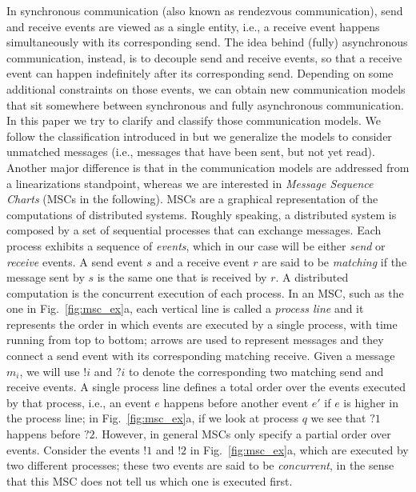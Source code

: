 


In synchronous communication (also known as rendezvous communication), send and receive events are  viewed as a single entity, i.e., a receive event  happens simultaneously with its corresponding send. The  idea behind (fully) asynchronous communication, instead, is to decouple send and receive events, so that a receive event can happen indefinitely after its corresponding send. Depending on some additional constraints on those events, we can obtain new communication models that sit somewhere between synchronous and fully asynchronous communication.
In this paper we try to clarify and classify those communication models. We follow the classification introduced in \cite{DBLP:journals/fac/ChevrouHQ16} but we generalize the models to  consider unmatched messages (i.e., messages that have been sent, but not yet read). Another major difference is that in \cite{DBLP:journals/fac/ChevrouHQ16} the communication models are addressed from a linearizations standpoint, whereas we are interested in \emph{Message Sequence Charts} (MSCs in the following). 
MSCs  are a graphical representation of the  computations of distributed systems.  Roughly speaking, a distributed system is composed by a set of sequential processes that can exchange messages. Each process exhibits a sequence of \emph{events}, which in our case will be either \emph{send} or \emph{receive} events. A send event $s$ and a receive event $r$ are said to be \emph{matching} if the message sent by $s$ is the same one that is received by $r$. A distributed computation is the concurrent execution of each process. In an MSC, such as the one in Fig.~\ref{fig:msc_ex}a, each vertical line is called a \emph{process line} and it represents the order in which events are executed by a single process, with time running from top to bottom; arrows are used to represent messages and they connect a send event with its corresponding matching receive. 
Given a message $m_i$, we will use $!i$ and $?i$ to denote the corresponding two matching send and receive events. A single process line defines a total order over the events executed by that process, i.e., an event $e$ happens before another event $e'$ if $e$ is higher in the process line; in Fig.~\ref{fig:msc_ex}a, if we look at process $q$ we see that $?1$ happens before $?2$. However, in general MSCs only specify a partial order over events. Consider the events $!1$ and $!2$ in Fig.~\ref{fig:msc_ex}a, which are executed by two different processes; these two events are said to be \emph{concurrent}, in the sense that this MSC does not tell us which one is executed first. 
